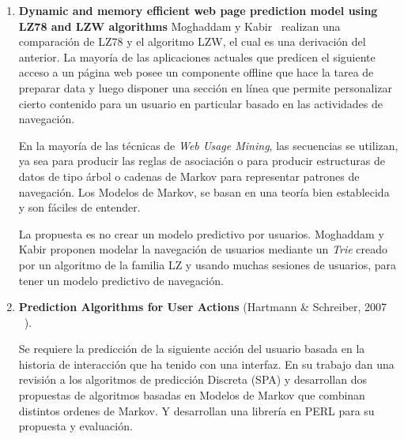 \vspace{1cm}
\begin{enumerate}


  \item \textbf{Dynamic and memory efficient web page prediction model using LZ78 and LZW algorithms } 
  Moghaddam y Kabir~\cite{Moghaddam2009}  realizan una comparación de LZ78  y el algoritmo LZW, el cual es una derivación del anterior. La mayoría de las aplicaciones actuales que predicen el siguiente acceso a un página web posee un  componente offline que hace la tarea de preparar data y luego disponer una sección en línea que permite personalizar cierto contenido para un usuario en particular basado en las actividades de navegación.
	
	En la mayoría de las técnicas de \emph{Web Usage Mining}, las secuencias se utilizan, ya sea para producir las reglas de asociación o para producir estructuras de datos de tipo árbol o cadenas de Markov para representar patrones de navegación. Los  Modelos de Markov, se basan en una teoría bien establecida y son fáciles de entender.  
	

	La propuesta es no crear un modelo predictivo por usuarios.
	Moghaddam y Kabir proponen modelar la navegación de usuarios mediante un \emph{Trie} creado por un algoritmo de la familia LZ y usando muchas sesiones de usuarios, para tener un modelo predictivo de navegación.






  \item \textbf{Prediction Algorithms for User Actions} (Hartmann \& Schreiber, 2007  \etal~\cite{hartmann2007}).
	{
	Se requiere la predicción de la siguiente acción del usuario basada en la historia de interacción que ha tenido con una interfaz. 
	En su trabajo dan una revisión a los algoritmos de predicción Discreta (SPA) y desarrollan dos propuestas de algoritmos basadas en Modelos de Markov que combinan distintos ordenes de Markov. Y desarrollan una librería en PERL para su propuesta y evaluación.
	
	
	
	
}
\end{enumerate}

